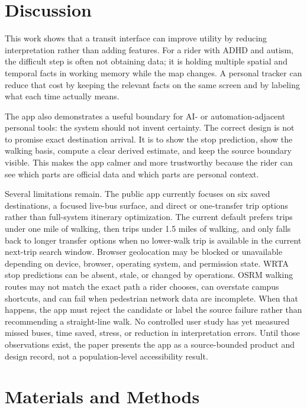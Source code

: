 \documentclass[12pt,letterpaper]{article}
\begin{document}
\section{Discussion}

This work shows that a transit interface can improve utility by reducing interpretation rather than adding features. For a rider with ADHD and autism, the difficult step is often not obtaining data; it is holding multiple spatial and temporal facts in working memory while the map changes. A personal tracker can reduce that cost by keeping the relevant facts on the same screen and by labeling what each time actually means.

The app also demonstrates a useful boundary for AI- or automation-adjacent personal tools: the system should not invent certainty. The correct design is not to promise exact destination arrival. It is to show the stop prediction, show the walking basis, compute a clear derived estimate, and keep the source boundary visible. This makes the app calmer and more trustworthy because the rider can see which parts are official data and which parts are personal context.

Several limitations remain. The public app currently focuses on six saved destinations, a focused live-bus surface, and direct or one-transfer trip options rather than full-system itinerary optimization. The current default prefers trips under one mile of walking, then trips under 1.5 miles of walking, and only falls back to longer transfer options when no lower-walk trip is available in the current next-trip search window. Browser geolocation may be blocked or unavailable depending on device, browser, operating system, and permission state. WRTA stop predictions can be absent, stale, or changed by operations. OSRM walking routes may not match the exact path a rider chooses, can overstate campus shortcuts, and can fail when pedestrian network data are incomplete. When that happens, the app must reject the candidate or label the source failure rather than recommending a straight-line walk. No controlled user study has yet measured missed buses, time saved, stress, or reduction in interpretation errors. Until those observations exist, the paper presents the app as a source-bounded product and design record, not a population-level accessibility result.

\section{Materials and Methods}
\end{document}

